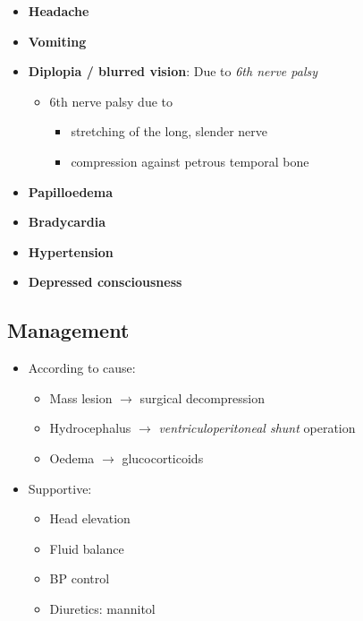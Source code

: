 \documentclass[
  12pt,
]{memoir}
\providecommand{\tightlist}{%
  \setlength{\itemsep}{0pt}\setlength{\parskip}{0pt}}
\begin{document}
\begin{itemize}
\tightlist
\item
  \textbf{Headache}
\item
  \textbf{Vomiting}
\item
  \textbf{Diplopia / blurred vision}: Due to \emph{6th nerve palsy}

  \begin{itemize}
  \tightlist
  \item
    6th nerve palsy due to

    \begin{itemize}
    \tightlist
    \item
      stretching of the long, slender nerve
    \item
      compression against petrous temporal bone
    \end{itemize}
  \end{itemize}
\item
  \textbf{Papilloedema}
\item
  \textbf{Bradycardia}
\item
  \textbf{Hypertension}
\item
  \textbf{Depressed consciousness}
\end{itemize}

\hypertarget{management-1}{%
\subsection{Management}\label{management-1}}

\begin{itemize}
\tightlist
\item
  According to cause:

  \begin{itemize}
  \tightlist
  \item
    Mass lesion \(\rightarrow\) surgical decompression
  \item
    Hydrocephalus \(\rightarrow\) \emph{ventriculoperitoneal shunt}
    operation
  \item
    Oedema \(\rightarrow\) glucocorticoids
  \end{itemize}
\item
  Supportive:

  \begin{itemize}
  \tightlist
  \item
    Head elevation
  \item
    Fluid balance
  \item
    BP control
  \item
    Diuretics: mannitol
  \end{itemize}
\end{itemize}
\end{document}
